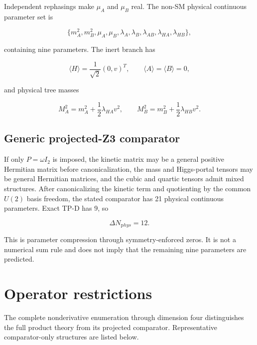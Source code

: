 \documentclass[
]{article}
\begin{document}
Independent rephasings make \(\mu_A\) and \(\mu_B\) real. The non-SM
physical continuous parameter set is

\[
\{m_A^2,m_B^2,\mu_A,\mu_B,\lambda_A,\lambda_B,
\lambda_{AB},\lambda_{HA},\lambda_{HB}\},
\]

containing nine parameters. The inert branch has

\[
\langle H\rangle=\frac{1}{\sqrt2}(0,v)^T,\qquad
\langle A\rangle=\langle B\rangle=0,
\]

and physical tree masses

\[
M_A^2=m_A^2+\frac12\lambda_{HA}v^2,\qquad
M_B^2=m_B^2+\frac12\lambda_{HB}v^2.
\]

\hypertarget{generic-projected-z3-comparator}{%
\subsection{Generic projected-Z3
comparator}\label{generic-projected-z3-comparator}}

If only \(P=\omega I_2\) is imposed, the kinetic matrix may be a general
positive Hermitian matrix before canonicalization, the mass and
Higgs-portal tensors may be general Hermitian matrices, and the cubic
and quartic tensors admit mixed structures. After canonicalizing the
kinetic term and quotienting by the common \(U(2)\) basis freedom, the
stated comparator has 21 physical continuous parameters. Exact TP-D has
9, so

\[
\Delta N_{\mathrm phys}=12.
\]

This is parameter compression through symmetry-enforced zeros. It is not
a numerical sum rule and does not imply that the remaining nine
parameters are predicted.

\hypertarget{operator-restrictions}{%
\section{Operator restrictions}\label{operator-restrictions}}

The complete nonderivative enumeration through dimension four
distinguishes the full product theory from its projected comparator.
Representative comparator-only structures are listed below.
\end{document}
